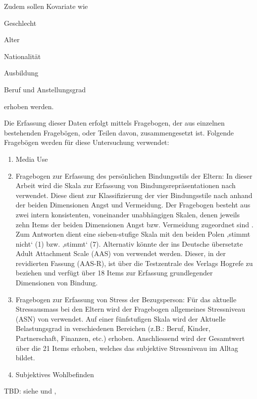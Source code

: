 Zudem sollen Kovariate wie 
\begin{seriate}
    \item Geschlecht
    \item Alter
    \item Nationalität
    \item Ausbildung
    \item Beruf und Anstellungsgrad
\end{seriate}
erhoben werden.

Die Erfassung dieser Daten erfolgt mittels Fragebogen, der aus einzelnen bestehenden Fragebögen, oder Teilen davon, zusammengesetzt ist. Folgende Fragebögen werden für diese Untersuchung verwendet:
\begin{enumerate}
    \item Media Use
    \item Fragebogen zur Erfassung des persönlichen Bindungsstils der Eltern: 
In dieser Arbeit wird die Skala zur Erfassung von Bindungsrepräsentationen nach  verwendet. Diese dient zur Klassifizierung der vier Bindungsstile nach  anhand der beiden Dimensionen Angst und Vermeidung. Der Fragebogen besteht aus zwei intern konsistenten, voneinander unabhängigen Skalen, denen jeweils zehn Items der beiden Dimensionen Angst bzw. Vermeidung zugeordnet sind \cite{Baadte2006}. Zum Antworten dient eine sieben-stufige Skala mit den beiden Polen ‚stimmt nicht‘ (1) bzw. ‚stimmt‘ (7). Alternativ könnte der ins Deutsche übersetzte Adult Attachment Scale (AAS) von  verwendet werden. Dieser, in der revidierten Fassung (AAS-R),  ist über die Testzentrale des Verlags Hogrefe zu beziehen und verfügt  über 18 Items zur Erfassung grundlegender Dimensionen von Bindung.
    \item Fragebogen zur Erfassung von Stress der Bezugsperson: Für das aktuelle Stressausmass bei den Eltern wird der Fragebogen allgemeines Stressniveau (ASN) von  verwendet. Auf einer fünfstufigen Skala wird der Aktuelle Belastungsgrad in verschiedenen Bereichen (z.B.: Beruf, Kinder, Partnerschaft, Finanzen, etc.) erhoben. Anschliessend wird der Gesamtwert über die 21 Items erhoben, welches das subjektive Stressniveau im Alltag bildet.
    
    \item Subjektives Wohlbefinden 
\end{enumerate}

TBD: siehe \cite{AmericanAcademyofPediatrics2013} und \cite{Plowman2014}, \cite{Nikken2014}

